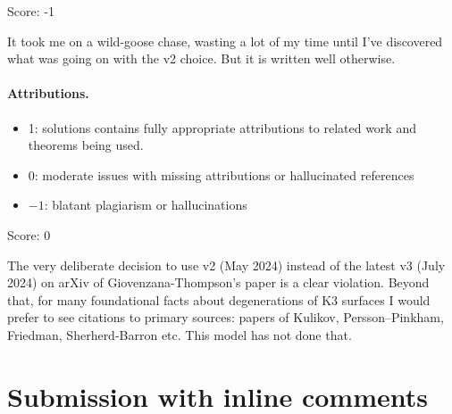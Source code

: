 \documentclass[11pt]{article}
\theoremstyle{definition}
\theoremstyle{remark}
\newcommand{\Q}{\mathbb Q}
\begin{document}
\noindent Score: -1

It took me on a wild-goose chase, wasting a lot of my time until I've discovered what was going on with the v2 choice. But it is written well otherwise.

\paragraph{Attributions.}
\begin{itemize}
	\item  1: solutions contains fully appropriate attributions
		to related work and theorems being used.
	\item  0: moderate issues with missing attributions or hallucinated references
	\item  $-1$: blatant plagiarism or hallucinations
\end{itemize}

\noindent Score: 0

The very deliberate decision to use v2 (May 2024) instead of the latest v3 (July 2024) on arXiv of Giovenzana-Thompson's paper is a clear violation. Beyond that, for many foundational facts about degenerations of K3 surfaces I would prefer to see citations to primary sources: papers of Kulikov, Persson--Pinkham, Friedman, Sherherd-Barron etc. This model has not done that.

\newpage
\section{Submission with inline comments}


\begin{abstract}
We examine the proposed correspondence between $H$-polarised Tyurin degenerations of K3 surfaces and elliptic fibrations on $H\oplus E_8\oplus E_8$-quasipolarised K3 surfaces, using the sign conventions in the cited definitions of Giovenzana--Thompson. For an elliptic fibration $W$ over a disc with boundary fibre $F$, we prove that their required component isometry forces $K_V^2=-\dim_{\Q}H_1(W,F;\Q)$. Thus a positive-degree rational component is impossible. We construct an $H$-polarised Tyurin degeneration with component degrees $1$ and $-1$, an effective flat nef Cartier divisor of positive square on both components, and boundary point outside all closures of proper interior Noether--Lefschetz loci. This gives a counterexample to the stated existence assertion. The obstruction depends on the simultaneous choices of fibre intersection, clockwise displacement in the Seifert pairing, and anticlockwise monodromy; it makes no assertion about a correspondence with modified conventions.
\end{abstract}
\end{document}

